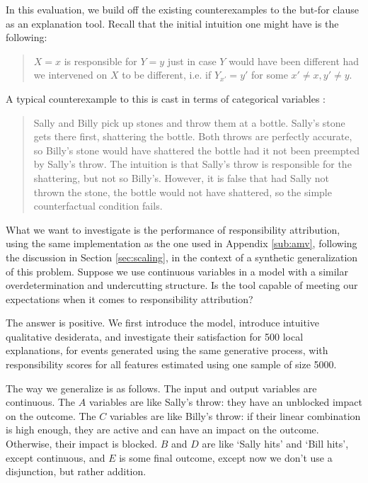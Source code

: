 \documentclass[twoside,11pt]{article}
\begin{document}
In this evaluation, we build off the existing counterexamples to the but-for clause as an explanation tool. Recall that the  initial intuition one might have is the following:

\begin{quote}
$X=x$ is responsible for $Y=y$ just in case $Y$ would have been different had we intervened on $X$ to be different, i.e. if $Y_{x'} = y'$ for some $x' \neq x, y' \neq y$. 
\end{quote}

A typical counterexample to this is cast in terms of categorical variables \cite{actualCausalityHalpern}: 

\begin{quote} Sally and Billy pick up stones and throw them at a bottle. Sally’s stone gets there first, shattering the bottle. Both throws are perfectly accurate, so Billy’s stone would have shattered the bottle had it not been preempted by Sally’s throw. The intuition is that Sally's throw is responsible for the shattering, but not so Billy's. However, it is false that had Sally not thrown the stone, the bottle would not have shattered, so the simple counterfactual condition fails.
\end{quote}

What we want to investigate is the performance of responsibility attribution, using the same implementation as the one used in Appendix \ref{sub:amv}, following the discussion in Section \ref{sec:scaling}, in the context of a synthetic generalization of this problem. Suppose we use continuous variables in a model with a similar overdetermination and undercutting structure. Is the tool capable of meeting our expectations when it comes to responsibility attribution? 

The answer is positive. We first introduce the model, introduce intuitive qualitative desiderata, and investigate their satisfaction for 500 local explanations, for events generated using the same generative process, with responsibility scores for all features estimated using one sample of size 5000.

The way we generalize is as follows. The input and output variables are continuous. The $A$ variables are like Sally's throw: they have an unblocked impact on the outcome. The $C$ variables are like Billy's throw: if their linear combination is high enough, they are active and can have an impact on the outcome. Otherwise, their impact is blocked. $B$ and $D$ are like `Sally hits' and `Bill hits', except continuous, and $E$ is some final outcome, except now we don't use a disjunction, but rather addition. 
\end{document}
